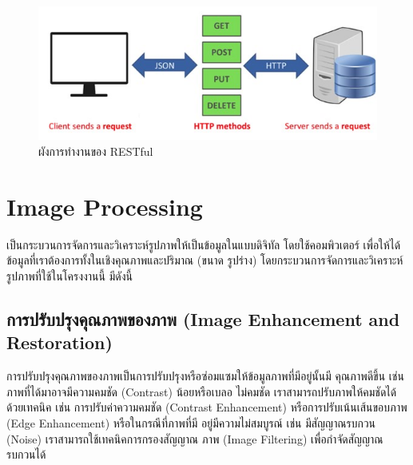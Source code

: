 \begin{figure}[!ht]
  \begin{center}
    \includegraphics[scale=.6]{pic/restapi.jpg}
    \caption[ผังการทำงานของ RESTful]{ผังการทำงานของ RESTful}
    \label{fig:restapi}
  \end{center}
\end{figure}

\section{Image Processing }
เป็นกระบวนการจัดการและวิเคราะห์รูปภาพให้เป็นข้อมูลในแบบดิจิทัล โดยใช้คอมพิวเตอร์ 
เพื่อให้ได้ข้อมูลที่เราต้องการทั้งในเชิงคุณภาพและปริมาณ (ขนาด รูปร่าง) \cite{Image} โดยกระบวนการจัดการและวิเคราะห์รูปภาพที่ใช้ในโครงงานนี้ มีดังนี้

\subsection{การปรับปรุงคุณภาพของภาพ   (Image Enhancement and Restoration) }
การปรับปรุงคุณภาพของภาพเป็นการปรับปรุงหรือซ่อมแซมให้ข้อมูลภาพที่มีอยู่นั้นมี คุณภาพดีขึ้น เช่น ภาพที่ได้มาอาจมีความคมชัด (Contrast) น้อยหรือเบลอ ไม่คมชัด 
เราสามารถปรับภาพให้คมชัดได้ด้วยเทคนิค เช่น การปรับค่าความคมชัด (Contrast Enhancement) หรือการปรับเน้นเส้นขอบภาพ (Edge Enhancement) 
หรือในกรณีที่ภาพที่มี อยู่มีความไม่สมบูรณ์ เช่น มีสัญญาณรบกวน (Noise) เราสามารถใช้เทคนิคการกรองสัญญาณ ภาพ (Image Filtering) เพื่อกำจัดสัญญาณรบกวนได้

